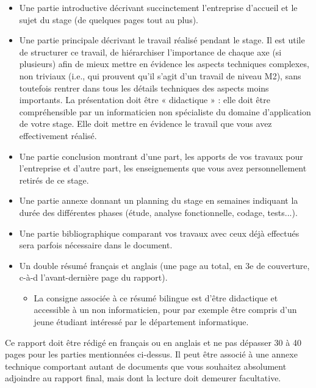 \begin{itemize}[label=$\bullet$]
    \item Une partie introductive décrivant succinctement l'entreprise d'accueil et le sujet du stage (de quelques pages tout au plus).
    \item Une partie principale décrivant le travail réalisé pendant le stage. Il est utile de structurer ce travail, de hiérarchiser l'importance de chaque axe (si plusieurs) afin de mieux mettre en évidence les aspects techniques complexes, non triviaux (i.e., qui prouvent qu'il s'agit d'un travail de niveau M2), sans toutefois rentrer dans tous les détails techniques des aspects moins importants. La présentation doit être « didactique » : elle doit être compréhensible par un informaticien non spécialiste du domaine d'application de votre stage. Elle doit mettre en évidence le travail que vous avez effectivement réalisé.
    \item Une partie conclusion montrant d'une part, les apports de vos travaux pour l'entreprise et d'autre part, les enseignements que vous avez personnellement retirés de ce stage.
    \item Une partie annexe donnant un planning du stage en semaines indiquant la durée des différentes phases (étude, analyse fonctionnelle, codage, tests...).
    \item Une partie bibliographique comparant vos travaux avec ceux déjà effectués sera parfois nécessaire dans le document.
    \item Un double résumé français et anglais (une page au total, en 3e de couverture, c-à-d l'avant-dernière page du rapport).
        \begin{itemize}[label=$\diamond$]
            \item La consigne associée à ce résumé bilingue est d'être didactique et accessible à un non informaticien, pour par exemple être compris d'un jeune étudiant intéressé par le département informatique.
        \end{itemize}
\end{itemize}
Ce rapport doit être rédigé en français ou en anglais et ne pas dépasser 30 à 40 pages pour les parties mentionnées ci-dessus. Il peut être associé à une annexe technique comportant autant de documents que vous souhaitez absolument adjoindre au rapport final, mais dont la lecture doit demeurer facultative.
